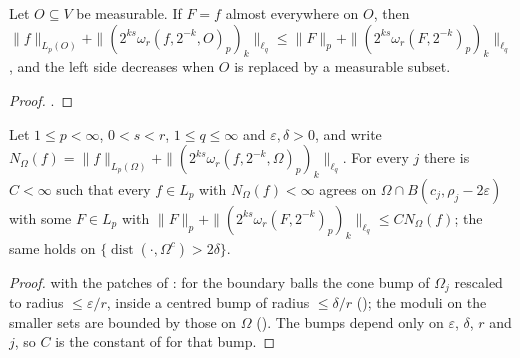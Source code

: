 \begin{lemma}
\label{lem:restriction-moduli}
\leanok
{}
Let $O \subseteq V$ be measurable. If $F = f$ almost everywhere on $O$, then
$\|f\|_{L_p(O)} + \|(2^{ks} \omega_r(f, 2^{-k}, O)_p)_k\|_{\ell_q} \leq
\|F\|_p + \|(2^{ks} \omega_r(F, 2^{-k})_p)_k\|_{\ell_q}$, and the left side decreases when $O$ is
replaced by a measurable subset.
\end{lemma}

\begin{proof}
\leanok
{}.
\end{proof}

\begin{lemma}
\label{lem:bounded-patches}
\leanok
{}
Let $1 \leq p < \infty$, $0 < s < r$, $1 \leq q \leq \infty$ and $\varepsilon, \delta > 0$, and
write $N_\Omega(f) = \|f\|_{L_p(\Omega)} + \|(2^{ks} \omega_r(f, 2^{-k}, \Omega)_p)_k\|_{\ell_q}$.
For every $j$ there is $C < \infty$ such that every $f \in L_p$ with $N_\Omega(f) < \infty$ agrees
on $\Omega \cap B(c_j, \rho_j - 2\varepsilon)$ with some $F \in L_p$ with
$\|F\|_p + \|(2^{ks} \omega_r(F, 2^{-k})_p)_k\|_{\ell_q} \leq C N_\Omega(f)$; the same holds on
$\{\operatorname{dist}(\cdot, \Omega^c) > 2\delta\}$.
\end{lemma}

\begin{proof}
\leanok
{} with the patches of : for the boundary balls the cone
bump of $\Omega_j$ rescaled to radius $\leq \varepsilon / r$, inside a centred bump of radius
$\leq \delta / r$ (); the moduli on the smaller sets are bounded by
those on $\Omega$ (). The bumps depend only on $\varepsilon$,
$\delta$, $r$ and $j$, so $C$ is the constant of  for that bump.
\end{proof}

